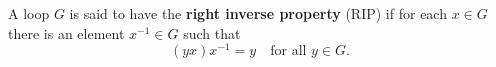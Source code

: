 A loop $G$ is said to have the \textbf{right inverse property} (RIP) if for each $x \in G$ there is an element $x^{-1} \in G$ such that
$$(yx)x^{-1} = y \quad \text{for all } y \in G.$$
